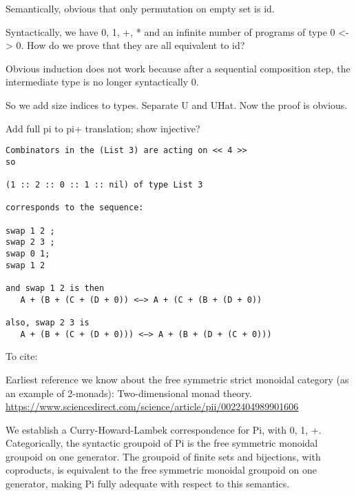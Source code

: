 \newpage

Semantically, obvious that only permutation on empty set is id.

Syntactically, we have 0, 1, +, *  and an infinite number of programs of type 0
<-> 0. How do we prove that they are all equivalent to id?

Obvious induction does not work because after a sequential composition step, the
intermediate type is no longer syntactically 0.

So we add size indices to types. Separate U and UHat. Now the proof is obvious.


Add full pi to pi+ translation; show injective?

\begin{verbatim}
Combinators in the (List 3) are acting on << 4 >>
so

(1 :: 2 :: 0 :: 1 :: nil) of type List 3

corresponds to the sequence:

swap 1 2 ;
swap 2 3 ;
swap 0 1;
swap 1 2

and swap 1 2 is then
   A + (B + (C + (D + 0)) <—> A + (C + (B + (D + 0))

also, swap 2 3 is
   A + (B + (C + (D + 0))) <—> A + (B + (D + (C + 0)))
\end{verbatim}

To cite:

Earliest reference we know about the free symmetric strict monoidal category (as
an example of 2-monads): Two-dimensional monad
theory. \url{https://www.sciencedirect.com/science/article/pii/0022404989901606}


We establish a Curry-Howard-Lambek correspondence for Pi, with 0, 1,
+. Categorically, the syntactic groupoid of Pi is the free symmetric monoidal
groupoid on one generator. The groupoid of finite sets and bijections, with
coproducts, is equivalent to the free symmetric monoidal groupoid on one
generator, making Pi fully adequate with respect to this semantics.


